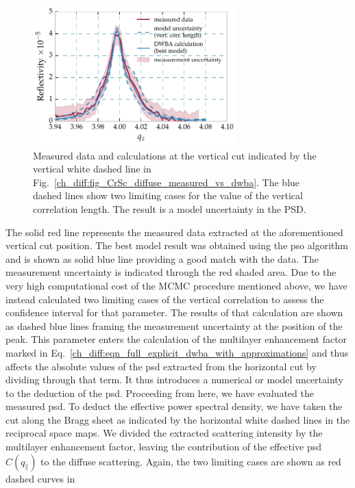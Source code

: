 \begin{figure}[htbp]
  \centering
  \includegraphics[width=0.7\textwidth]{img/CrSc_diffuse_vertical_correlation}
  \caption{Measured data and calculations at the vertical cut indicated by the vertical white dashed line in Fig.~\ref{ch_diff:fig_CrSc_diffuse_measured_vs_dwba}. The blue dashed lines show two limiting cases for the value of the vertical correlation length. The result is a model uncertainty in the PSD.}
  \label{ch_diff:fig_CrSc_diffuse_vertical_correlation}
\end{figure}
The solid red line represents the measured data extracted at the aforementioned vertical cut position. The best model result was obtained using the \gls{pso} algorithm and is shown as solid blue line providing a good match with the data. The measurement uncertainty is indicated through the red shaded area. Due to the very high computational cost of the MCMC procedure mentioned above, we have instead
calculated two limiting cases of the vertical correlation to assess the confidence interval for that parameter. The results of that calculation are shown as dashed blue lines framing the measurement uncertainty at the position of the peak. This parameter enters the calculation of the multilayer enhancement factor marked in Eq.~\eqref{ch_diff:eqn_full_explicit_dwba_with_approximations} and thus affects the absolute values of the \gls{psd} extracted from the horizontal cut by dividing through that term. It thus introduces a numerical or model uncertainty to the deduction of the \gls{psd}. Proceeding from here, we have evaluated the measured 
\gls{psd}. To deduct the effective power spectral density, we have taken the cut along the Bragg sheet as indicated by the horizontal white dashed lines in the reciprocal space 
maps. We divided the extracted scattering intensity by the multilayer 
enhancement factor, leaving the contribution of the effective \gls{psd} $C(q_\parallel)$ to the diffuse scattering. Again, the two limiting cases are shown as red dashed curves in 
